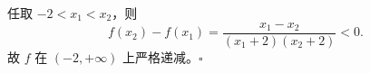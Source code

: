 任取 $-2<x_1<x_2$，则
\[
 f(x_2)-f(x_1)
 =\frac{x_1-x_2}{(x_1+2)(x_2+2)}<0.
\]
故 $f$ 在 $(-2,+\infty)$ 上严格递减。$\square$
